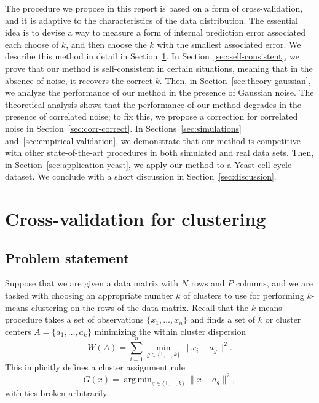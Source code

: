 \documentclass[12pt]{article}
\DeclareMathOperator*{\argmin}{arg\,min}
\begin{document}
The procedure we propose in this report is based on a form of
cross-validation, and it is adaptive to the characteristics of the data
distribution. The essential idea is to devise a way to measure a form of
internal prediction error associated each choose of $k$, and then choose the
$k$ with the smallest associated error. We describe this method in detail in
Section~\ref{sec:meth}.  In Section~\ref{sec:self-consistent}, we prove that
our method is self-consistent in certain situations, meaning that in the
absence of noise, it recovers the correct $k$. Then, in
Section~\ref{sec:theory-gaussian}, we
analyze the performance of our method in the presence of Gaussian noise. The
theoretical analysis shows that the performance of our method degrades in the
presence of correlated noise; to fix this, we propose a correction for
correlated noise in Section~\ref{sec:corr-correct}. In
Sections~\ref{sec:simulations} and~\ref{sec:empirical-validation}, we
demonstrate that our method is competitive with other state-of-the-art
procedures in both simulated and real data sets. Then, in
Section~\ref{sec:application-yeast}, we apply our method to a Yeast cell cycle
dataset. We conclude with a short discussion in Section~\ref{sec:discussion}.


\section{Cross-validation for clustering}
\label{sec:meth}

\subsection{Problem statement}
\label{sec:problem-statement}

Suppose that we are given a data matrix with $N$ rows and $P$ columns, and we
are tasked with choosing an appropriate number $k$ of clusters to use for
performing $k$-means clustering on the rows of the data matrix. Recall that
the $k$-means procedure takes a set of observations $\{ x_1, \dotsc ,x_n \}$
and finds a set of $k$ or cluster centers $A = \{ a_1, \dotsc, a_k \} $
minimizing the within cluster dispersion
\[
    W(A) = \sum_{i=1}^{n} \min_{g \in \{ 1, \dotsc, k \} } \|x_i - a_g\|^2.
\]
This implicitly defines a cluster assignment rule
\[
  G(x) = \argmin_{g \in \{1, \dotsc, k\}} \|x - a_g\|^2,
\]
with ties broken arbitrarily.
\end{document}
